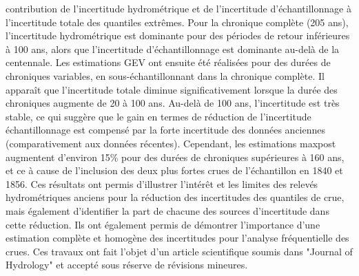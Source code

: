 contribution de l'incertitude hydrométrique et de l'incertitude d'échantillonnage à l'incertitude totale des quantiles extrêmes. Pour la chronique complète (205 ans), l'incertitude hydrométrique est dominante pour des périodes de retour inférieures à 100 ans, alors que l'incertitude d'échantillonnage est dominante au-delà de la centennale. Les estimations GEV ont ensuite été réalisées pour des durées de chroniques variables, en sous-échantillonnant dans la chronique complète. Il apparaît que l'incertitude totale diminue significativement lorsque la durée des chroniques augmente de 20 à 100 ans. Au-delà de 100 ans, l'incertitude est très stable, ce qui suggère que le gain en termes de réduction de l'incertitude échantillonnage est compensé par la forte incertitude des données anciennes (comparativement aux données récentes). Cependant, les estimations maxpost augmentent d'environ 15\% pour des durées de chroniques supérieures à 160 ans, et ce à cause de l'inclusion des deux plus fortes crues de l'échantillon en 1840 et 1856. Ces résultats ont permis d'illustrer l'intérêt et les limites des relevés hydrométriques anciens pour la réduction des incertitudes des quantiles de crue, mais également d'identifier la part de chacune des sources d'incertitude dans cette réduction. Ils ont également permis de démontrer l'importance d'une estimation complète et homogène des incertitudes pour l'analyse fréquentielle des crues. Ces travaux ont fait l'objet d'un article scientifique soumis dans "Journal of Hydrology" et accepté sous réserve de révisions mineures.
	
